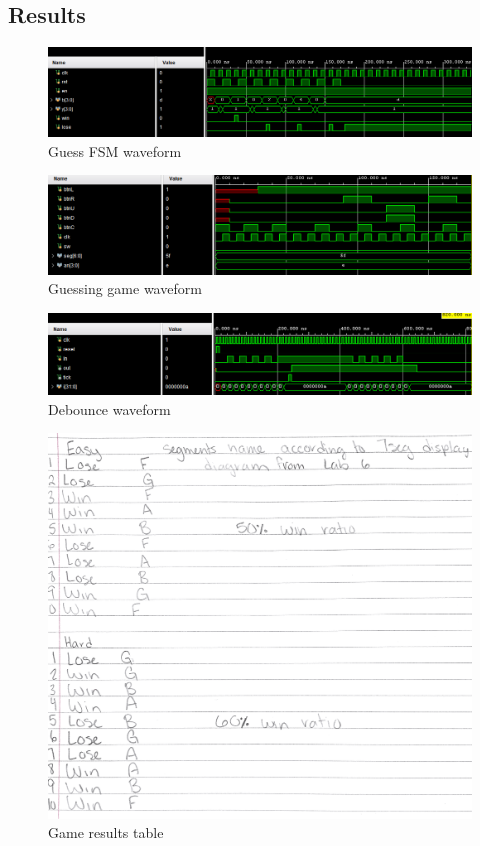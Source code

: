 \documentclass[11pt]{article}
\begin{document}
\begin{itemize}
\section*{Results}
\begin{figure}
	\includegraphics[width=\textwidth]{waveform1.png}
	\caption{Guess FSM waveform}
	\label{fig: gfw}
\end{figure}
\begin{figure}
	\includegraphics[width=\textwidth]{waveformgame.png}
	\caption{Guessing game waveform}
	\label{fig: ggw}
\end{figure}
\begin{figure}
	\includegraphics[width=\textwidth]{debouncewaveform.png}
	\caption{Debounce waveform}
	\label{fig: ggw}
\end{figure}
\begin{figure}
	\includegraphics[width=\textwidth]{gameresults.png}
	\caption{Game results table}
	\label{fig:grt}
\end{figure}


\end{itemize}
\end{document}
